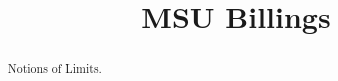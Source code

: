 \documentclass{xourse}
\title{MSU Billings}%
\begin{document}
      
\begin{abstract} %
Notions of Limits.
\end{abstract}
      
\maketitle
      

      
\end{document}

